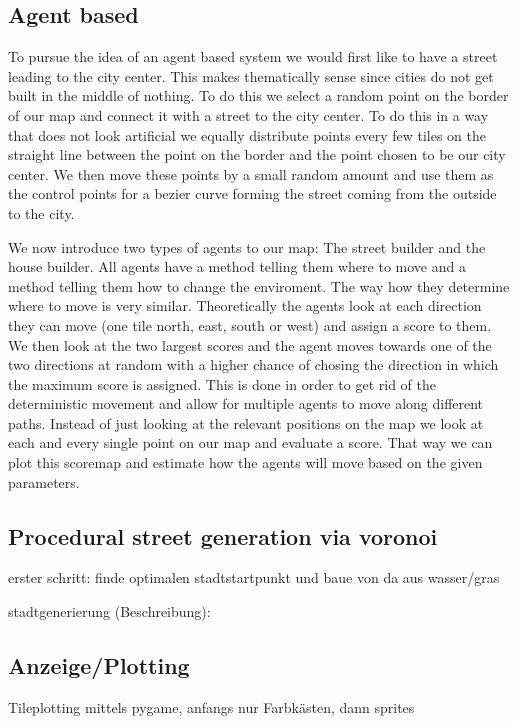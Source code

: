 \documentclass{scrartcl}
\begin{document}
\subsection{Agent based}
To pursue the idea of an agent based system we would first like to have a street
leading to the city center. This makes thematically sense since cities do not get
built in the middle of nothing. To do this we select a random point on the border
of our map and connect it with a street to the city center. To do this in a way
that does not look artificial we equally distribute points every few tiles on
the straight line between the point on the border and the point chosen to be our
city center. We then move these points by a small random amount and use them as the
control points for a bezier curve forming the street coming from the outside to
the city.

We now introduce two types of agents to our map: The street builder and the house builder.
All agents have a method telling them where to move and a method telling them
how to change the enviroment. The way how they determine where to move is very similar.
Theoretically the agents look at each direction they can move (one tile north, east, south or west)
and assign a score to them. We then look at the two largest scores and the agent
moves towards one of the two directions at random with a higher chance of chosing
the direction in which the maximum score is assigned. This is done in order to
get rid of the deterministic movement and allow for multiple agents to move along
different paths. Instead of just looking at the relevant positions on the map we
look at each and every single point on our map and evaluate a score. That way we
can plot this scoremap and estimate how the agents will move based on the given
parameters.


\subsection{Procedural street generation via voronoi}



erster schritt: finde optimalen stadtstartpunkt und baue von da aus
  wasser/gras

stadtgenerierung (Beschreibung):

\subsection{Anzeige/Plotting}
Tileplotting mittels pygame, anfangs nur Farbkästen, dann sprites
\end{document}
